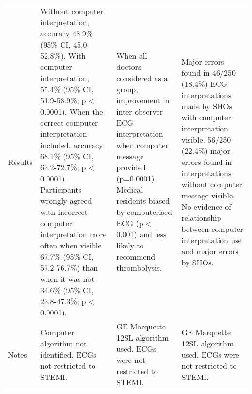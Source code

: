 \begin{longtable}{PQQQ}
Results&Without computer interpretation, accuracy 48.9\% (95\% CI, 45.0-52.8\%). With computer interpretation, 55.4\% (95\% CI, 51.9-58.9\%; p$<$0.0001). When the correct computer interpretation included, accuracy 68.1\% (95\% CI, 63.2-72.7\%; p$<$0.0001).  Participants wrongly agreed with incorrect computer interpretation more often when visible 67.7\% (95\% CI, 57.2-76.7\%) than when it was not 34.6\% (95\% CI, 23.8-47.3\%; p$<$0.0001).&When all doctors considered as a group, improvement in inter-observer ECG interpretation when computer message provided (p=0.0001).  Medical residents biased by computerised ECG (p$<$0.001) and less likely to recommend thrombolysis.&Major errors found in 46\slash 250 (18.4\%) ECG interpretations made by SHOs with computer interpretation visible. 56\slash 250 (22.4\%) major errors found in interpretations without computer message visible. No evidence of relationship between computer interpretation use and major errors by SHOs.\\
Notes&Computer algorithm not identified. ECGs not restricted to STEMI.&GE Marquette 12SL algorithm used. ECGs were not restricted to STEMI.&GE Marquette 12SL algorithm used. ECGs were not restricted to STEMI.\\


\end{longtable}
\renewcommand{\arraystretch}{1}
\normalsize